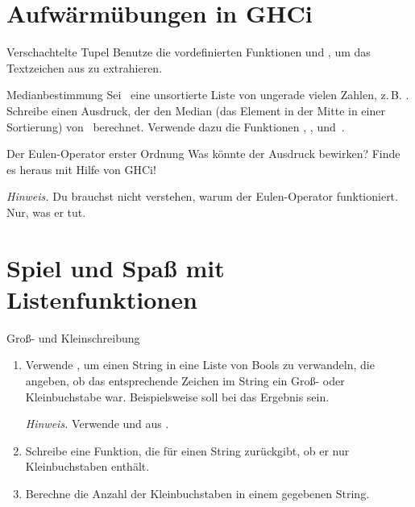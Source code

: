 \documentclass{uebblatt}
\begin{document}


\section{Aufwärmübungen in GHCi}

\begin{aufgabe}{Verschachtelte Tupel}
Benutze die vordefinierten Funktionen  und , um das Textzeichen aus  zu extrahieren.
\end{aufgabe}

\begin{aufgabe}{Medianbestimmung}
Sei~ eine unsortierte Liste von ungerade vielen Zahlen, z.\,B. . Schreibe einen Ausdruck, der den Median (das Element in der Mitte in einer Sortierung) von~ berechnet. Verwende dazu die Funktionen , ,  und~\haskellinline{!!}.
\end{aufgabe}

\begin{aufgabe}{Der Eulen-Operator erster Ordnung}
Was könnte der Ausdruck  bewirken? Finde es heraus mit Hilfe von GHCi!

{\scriptsize \emph{Hinweis.} Du brauchst nicht verstehen, warum der Eulen-Operator funktioniert. Nur, was er tut. \par}
\end{aufgabe}


\section{Spiel und Spaß mit Listenfunktionen}

\begin{aufgabe}{Groß- und Kleinschreibung}
  \begin{enumerate}
    \item Verwende , um einen String in eine Liste von Bools zu verwandeln, die angeben, ob das entsprechende Zeichen im String ein Groß- oder Kleinbuchstabe war.
    Beispielsweise soll bei  das Ergebnis  sein. \\
    {\scriptsize \emph{Hinweis.} Verwende  und  aus .\par}
    \item Schreibe eine Funktion, die für einen String zurückgibt, ob er nur Kleinbuchstaben enthält.
    \item Berechne die Anzahl der Kleinbuchstaben in einem gegebenen String.
  \end{enumerate}
\end{aufgabe}
\end{document}
